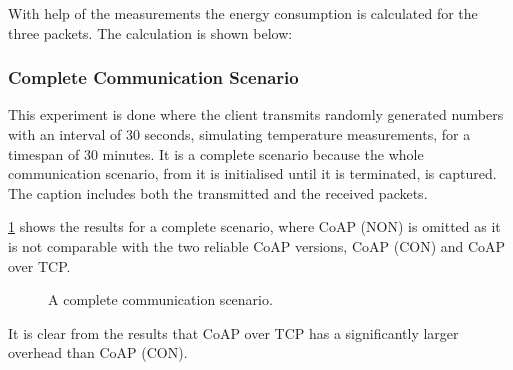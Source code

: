 With help of the measurements the energy consumption is calculated for the three packets. The calculation is shown below:


\subsubsection{Complete Communication Scenario}
This experiment is done where the client transmits randomly generated numbers with an interval of 30 seconds, simulating temperature measurements, for a timespan of 30 minutes.
It is a complete scenario because the whole communication scenario, from it is initialised until it is terminated, is captured. The caption includes both the transmitted and the received packets.

\figurename{\ref{fig:completescenario}} shows the results for a complete scenario, where CoAP (NON) is omitted as it is not comparable with the two reliable CoAP versions, CoAP (CON) and CoAP over TCP. 
\begin{figure}[bht]
	\caption{A complete communication scenario.}
	\label{fig:completescenario}
\end{figure}

It is clear from the results that CoAP over TCP has a significantly larger overhead than CoAP (CON).
 
